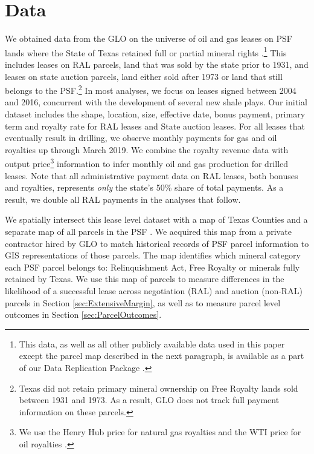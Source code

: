 \section{Data \label{sec:Data}}
We obtained data from the GLO on the universe of oil and gas leases on PSF lands where the State of Texas retained full or partial mineral rights \citep{activeleases,inactiveleases}.\footnote{This data, as well as all other publicly available data used in this paper except the parcel map described in the next paragraph, is available as a part of our Data Replication Package \citep{data}.} This includes leases on RAL parcels, land that was sold by the state prior to 1931, and leases on state auction parcels, land either sold after 1973 or land that still belongs to the PSF.\footnote{Texas did not retain primary mineral ownership on Free Royalty lands sold between 1931 and 1973. As a result, GLO does not track full payment information on these parcels.} In most analyses, we focus on leases signed between 2004 and 2016, concurrent with the development of several new shale plays.  Our initial dataset includes the shape, location, size, effective date, bonus payment, primary term and royalty rate for  RAL leases and  State auction leases.  For all leases that eventually result in drilling, we observe monthly payments for gas and oil royalties  up through March 2019.  We combine the royalty revenue data with output price\footnote{We use the Henry Hub price for natural gas royalties and the WTI price for oil royalties \citep{oilprices, gasprices}.} information to infer monthly oil and gas production for drilled leases. Note that all administrative payment data on RAL leases, both bonuses and royalties, represents \textit{only} the state's 50\% share of total payments.  As a result, we double all RAL payments in the analyses that follow.

We spatially intersect this lease level dataset with a map of Texas Counties \citep{census} and a separate map of all parcels in the PSF \citep{p2e}.  We acquired this map from a private contractor hired by GLO to match historical records of PSF parcel information to GIS representations of those parcels.  The map identifies which mineral category each PSF parcel belongs to: Relinquishment Act, Free Royalty or minerals fully retained by Texas.  We use this map of parcels to measure differences in the likelihood of a successful lease across negotiation (RAL) and auction (non-RAL) parcels in Section \ref{sec:ExtensiveMargin}, as well as to measure parcel level outcomes in Section \ref{sec:ParcelOutcomes}. 

